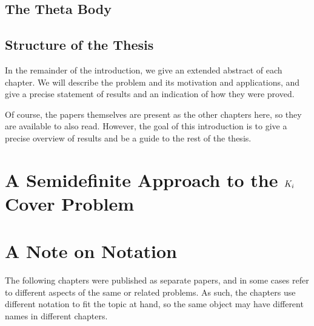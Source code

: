 \subsection{The Theta Body}

\subsection{Structure of the Thesis}
In the remainder of the introduction, we give an extended abstract of each
chapter. We will describe the problem and its motivation and applications,
and give a precise statement of results and an indication of how they were 
proved.

Of course, the papers themselves are present as the other chapters here, so
they are available to also read. However, the goal of this introduction
is to give a precise overview of results and be a guide to the rest of the
thesis.

\section{A Semidefinite Approach to the $K_\MakeLowercase{i}$ Cover Problem}

\section{A Note on Notation}
The following chapters were published as separate papers, and in some cases
refer to different aspects of the same or related problems. As such, the 
chapters use different notation to fit the topic at hand, so the same object
may have different names in different chapters.
